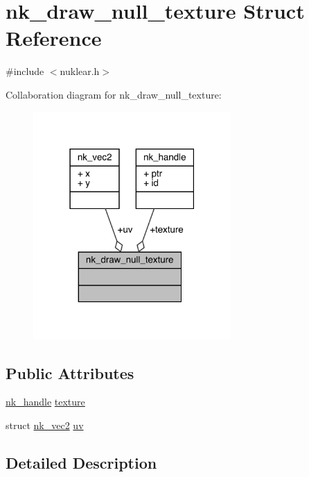 \hypertarget{structnk__draw__null__texture}{}\section{nk\+\_\+draw\+\_\+null\+\_\+texture Struct Reference}
\label{structnk__draw__null__texture}


{\ttfamily \#include $<$nuklear.\+h$>$}



Collaboration diagram for nk\+\_\+draw\+\_\+null\+\_\+texture\+:
\nopagebreak
\begin{figure}[H]
\begin{center}
\leavevmode
\includegraphics[width=214pt]{structnk__draw__null__texture__coll__graph}
\end{center}
\end{figure}
\subsection*{Public Attributes}
\begin{DoxyCompactItemize}
\item 
\mbox{\hyperlink{unionnk__handle}{nk\+\_\+handle}} \mbox{\hyperlink{structnk__draw__null__texture_a28406c59e642297560123c8f927dbf44}{texture}}
\item 
struct \mbox{\hyperlink{structnk__vec2}{nk\+\_\+vec2}} \mbox{\hyperlink{structnk__draw__null__texture_ae00f89beb79ed9aa53d2ddcbdd1ea7c7}{uv}}
\end{DoxyCompactItemize}


\subsection{Detailed Description}


